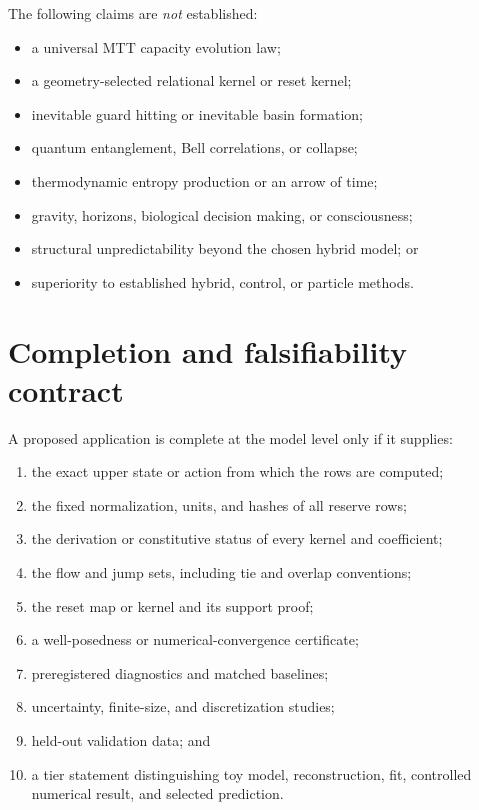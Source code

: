 \documentclass[11pt]{article}
\theoremstyle{definition}
\theoremstyle{remark}
\begin{document}
The following claims are \emph{not} established:

\begin{itemize}
\item a universal MTT capacity evolution law;
\item a geometry-selected relational kernel or reset kernel;
\item inevitable guard hitting or inevitable basin formation;
\item quantum entanglement, Bell correlations, or collapse;
\item thermodynamic entropy production or an arrow of time;
\item gravity, horizons, biological decision making, or consciousness;
\item structural unpredictability beyond the chosen hybrid model; or
\item superiority to established hybrid, control, or particle methods.
\end{itemize}

\section{Completion and falsifiability contract}
\label{sec:contract}

A proposed application is complete at the model level only if it supplies:

\begin{enumerate}[leftmargin=2em]
\item the exact upper state or action from which the rows are computed;
\item the fixed normalization, units, and hashes of all reserve rows;
\item the derivation or constitutive status of every kernel and coefficient;
\item the flow and jump sets, including tie and overlap conventions;
\item the reset map or kernel and its support proof;
\item a well-posedness or numerical-convergence certificate;
\item preregistered diagnostics and matched baselines;
\item uncertainty, finite-size, and discretization studies;
\item held-out validation data; and
\item a tier statement distinguishing toy model, reconstruction, fit,
      controlled numerical result, and selected prediction.
\end{enumerate}
\end{document}
